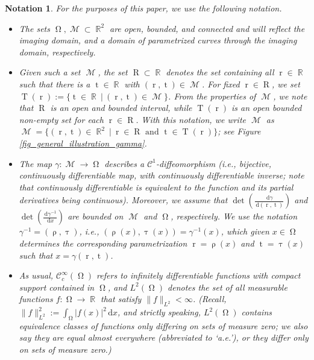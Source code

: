 \documentclass[12pt]{article}
\newtheorem{notation}[theorem]{Notation}
\DeclareMathOperator{\RR}{{\mathbb{R}}}
\newcommand{\dd}[1]{\,\mathrm{d}{#1}}
\DeclareMathOperator{\tvariable}{t}
\DeclareMathOperator{\tgroundset}{T}
\DeclareMathOperator{\rayvariable}{r}
\DeclareMathOperator{\raygroundset}{R}
\DeclareMathOperator{\tinverse}{\tau}
\DeclareMathOperator{\rayinverse}{\rho}
\DeclareMathOperator{\imgdom}{{\Omega}}
\DeclareMathOperator{\gammagroundset}{{\mathcal M}}
\begin{document}
\begin{notation}\label{Notation_basic_introduction}
For the purposes of this paper, we use the following notation.
\begin{itemize}
\item[1.a)]  The sets $\imgdom,\gammagroundset\subset \RR^2$ are open, bounded, and connected and will reflect the imaging domain, and a domain of parametrized curves through the imaging domain, respectively.

\item[1.b)] Given such a set $\gammagroundset$, the set $\raygroundset\subset \RR$ denotes the set containing all $\rayvariable\in \RR$ such that there is a $\tvariable\in \RR$ with $(\rayvariable,\tvariable)\in \gammagroundset$.
For fixed $\rayvariable\in \raygroundset$, we set $\tgroundset(\rayvariable):=\{\tvariable \in \RR \ \big | \ (\rayvariable,\tvariable) \in \gammagroundset\}$.  
From the properties of $\gammagroundset$, we note that $\raygroundset$ is an open and bounded interval, while $\tgroundset(\rayvariable)$ is an open bounded non-empty set for each $\rayvariable \in \raygroundset$.
With this notation, we write $\gammagroundset$ as 
$\gammagroundset=\{(\rayvariable,\tvariable)\in \RR^2 \ \big|\ \rayvariable\in \raygroundset \text { and } \tvariable \in \tgroundset(\rayvariable)\}$; see Figure \ref{fig_general_illustration_gamma}.


\item[1.c)] The map $\gamma \colon \gammagroundset \to \imgdom$ describes a $\mathcal{C}^1$-diffeomorphism (i.e., bijective, continuously differentiable map, with continuously differentiable inverse; note that continuously differentiable is equivalent to the function and its partial derivatives being continuous). Moreover, we assume that $\det\left( \frac{\dd \gamma}{\dd{(\rayvariable,\tvariable)}}\right)$ and $\det\left( \frac{\dd \gamma^{-1}}{\dd{x}}\right)$ are bounded on $\gammagroundset$ and $\imgdom$, respectively.
We use the notation $\gamma^{-1}=(\rayinverse,\tinverse)$, i.e., $(\rayinverse(x),\tinverse(x))=\gamma^{-1}(x)$,   which given $x\in \imgdom$ determines the corresponding parametrization $\rayvariable=\rayinverse(x)$ and $\tvariable=\tinverse(x)$ such that $x=\gamma(\rayvariable,\tvariable)$.


\item[2.a)] As usual, $\mathcal{C}^\infty_c(\imgdom)$ refers to infinitely differentiable functions with compact support contained in $\imgdom$, and $L^2(\imgdom)$ denotes the set of all measurable functions $f\colon \imgdom \to \RR$  that satisfy $\|f\|_{L^2}< \infty$. (Recall, $\|f\|_{L^2}^2:={\int_{\imgdom}|f(x)|^2\dd x}$, and strictly speaking, $L^2(\imgdom)$ contains equivalence classes of functions only differing on sets of measure zero; we also say they are equal almost everywhere (abbreviated to `a.e.'), or they differ only on sets of measure zero.)


\end{itemize}
\end{notation}
\end{document}
